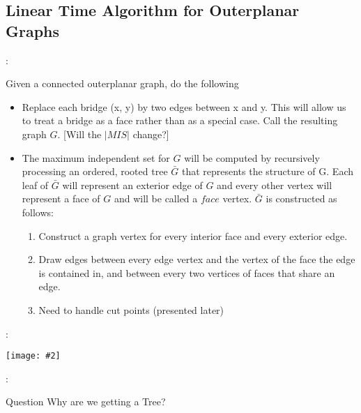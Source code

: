 \documentclass{beamer}
\newcommand{\iph}[2]{
    \texttt{[image: \#2]}
}
\begin{document}
\subsection{Linear Time Algorithm for Outerplanar Graphs}
\begin{frame}{\secname : \subsecname}
    \begin{block}{Given a connected outerplanar graph, do the following}
    \begin{itemize}
        \item Replace each bridge (x, y) by two
        edges between x and y. This will allow us to treat a bridge as a face rather
        than as a special case. Call the resulting graph $G$. [Will the $|MIS|$ change?]

        \item The maximum independent set for $G$ will be computed by recursively
processing an ordered, rooted tree $\bar{G}$ that represents the structure of G. Each
leaf of $\bar{G}$ will represent an exterior edge of $G$ and every other vertex will represent
a face of $G$ and will be called a $face$ vertex. $\bar{G}$ is constructed as follows:
        \begin{enumerate}
        \item Construct a graph vertex for every interior face and
        every exterior edge.

        \item Draw edges between every edge vertex and the vertex of the face the edge is contained in, and between
        every two vertices of faces that share an edge.

        \item Need to handle cut points (presented later)      
        \end{enumerate}
    \end{itemize}
    \end{block}

\end{frame}



\begin{frame}{\secname : \subsecname}
        \iph{0.9}{lin1}

\end{frame}

\begin{frame}{\secname : \subsecname}
    \begin{block}{Question}
        Why are we getting a Tree? 
    \end{block}

\end{frame}
\end{document}

